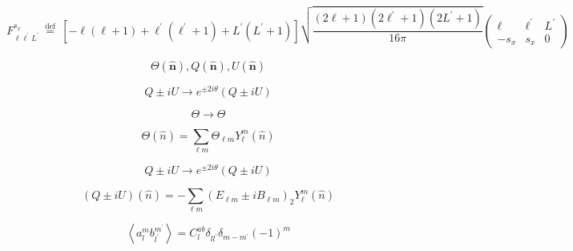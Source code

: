 \documentclass[12pt, notitlepage, onecolumn, amsmath, amssymb, aps]{revtex4-1}
\title{}
\begin{document}
\begin{equation}
  F_{\ell \ell^{\prime} L^{\prime}}^{s_{x}} \stackrel{\text { def }}{=}\left[-\ell\left(\ell+1\right)+\ell^{\prime}\left(\ell^{\prime}+1\right)+L^{\prime}\left(L^{\prime}+1\right)\right] \sqrt{\frac{\left(2 \ell+1\right)\left(2 \ell^{\prime}+1\right)\left(2 L^{\prime}+1\right)}{16 \pi}}\left(\begin{array}{ccc}{\ell} & {\ell^{\prime}} & {L^{\prime}} \\ {-s_{x}} & {s_{x}} & {0}\end{array}\right)
\end{equation}

\begin{equation}
  \Theta(\hat{\mathbf{n}}), Q(\hat{\mathbf{n}}), U(\hat{\mathbf{n}})
\end{equation}

\begin{equation}
  Q \pm i U \rightarrow e^{\pm 2 i \theta}(Q \pm i U)
\end{equation}

\begin{equation}
  \Theta \rightarrow \Theta
\end{equation}

\begin{equation}
  \Theta(\hat{n})=\sum_{\ell m}\Theta_{\ell m} Y_{\ell}^{m}(\hat{n})
\end{equation}

\begin{equation}
  Q \pm i U \rightarrow e^{\pm 2 i \theta}(Q \pm i U)
\end{equation}

\begin{equation}
  (Q \pm i U)(\hat{n})=-\sum_{\ell m}\left(E_{\ell m} \pm i B_{\ell m}\right)_{2} Y_{\ell}^{m}(\hat{n})
\end{equation}

\begin{equation}
  \left\langle a_{l}^{m} b_{l^{\prime}}^{m^{\prime}}\right\rangle=C_{l}^{a b} \delta_{l l^{\prime}} \delta_{m-m^{\prime}}(-1)^{m}
\end{equation}
\end{document}
